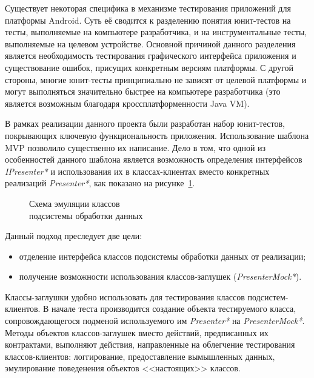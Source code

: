 Существует некоторая специфика в механизме тестирования приложений
для платформы Android. Суть её сводится к разделению понятия юнит-тестов
на тесты, выполняемые на компьютере разработчика, и на инструментальные тесты,
выполняемые на целевом устройстве.
Основной причиной данного разделения является необходимость тестирования
графического интерфейса приложения и существование ошибок,
присущих конкретным версиям платформы.
С другой стороны, многие юнит-тесты принципиально не зависят от
целевой платформы и могут выполняться значительно быстрее
на компьютере разработчика
(это является возможным благодаря кроссплатформенности Java VM).

В рамках реализации данного проекта были разработан набор юнит-тестов,
покрывающих ключевую функциональность приложения.
Использование шаблона MVP позволило существенно их написание.
Дело в том, что одной из особенностей данного шаблона является возможность
определения интерфейсов \textit{IPresenter*} и использования
их в классах-клиентах вместо конкретных реализаций \textit{Presenter*},
как показано на рисунке~\ref{fig:implementation_testing_presenter}.

\begin{figure}[h!]
  \centering
  \caption{Схема эмуляции классов \\ подсистемы обработки данных}
  \label{fig:implementation_testing_presenter}
\end{figure}

Данный подход преследует две цели:
\begin{itemize}
\item отделение интерфейса классов подсистемы обработки данных от реализации;
\item получение возможности использования классов-заглушек (\textit{PresenterMock*}).
\end{itemize}

Классы-заглушки удобно использовать для тестирования классов подсистем-клиентов.
В начале теста производится создание объекта тестируемого класса,
сопровождающегося подменой используемого им \textit{Presenter*}
на \textit{PresenterMock*}.
Методы объектов классов-заглушек вместо действий, предписанных их контрактами,
выполняют действия, направленные на облегчение тестирования классов-клиентов:
логгирование, предоставление вымышленных данных,
эмулирование поведенения объектов <<настоящих>> классов.

